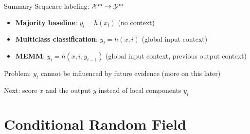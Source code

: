 \documentclass[usenames,dvipsnames,notes,11pt,aspectratio=169]{beamer}
\begin{document}
%

\begin{frame}
    {Summary}
    Sequence labeling: $\mathcal{X}^m \rightarrow \mathcal{Y}^m$
    \begin{itemize}
        \item \textbf{Majority baseline}: $y_i = h(x_i)$ (no context)
        \item \textbf{Multiclass classification}: $y_i = h(x, i)$ (global input context)
        \item \textbf{MEMM}: $y_i = h(x, i, y_{i-1})$ (global input context, previous output context)
    \end{itemize}

    Problem: $y_t$ cannot be influenced by future evidence (more on this later)

    Next: score $x$ and the output $y$ instead of local components $y_i$ 
\end{frame}

\section{Conditional Random Field}
\end{document}
